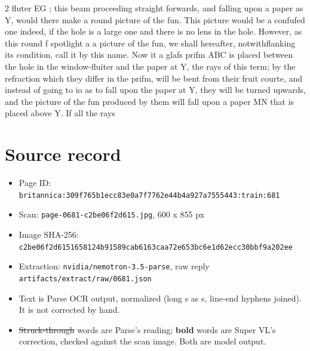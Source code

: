 \documentclass[10pt]{article}
\begin{document}
\begin{multicols}{2}
fluter EG ; this beam proceeding straight forwards, and falling upon a paper as Y, would there make a round picture of the fun. This picture would be a confufed one indeed, if the hole is a large one and there is no lens in the hole. However, as this round f spotlight a a picture of the fun, we shall hereafter, notwithflanking its condition, call it by this name. Now it a glafs prifm ABC is placed between the hole in the window-fluiter and the paper at Y, the rays of this term; by the refraction which they differ in the prifm, will be bent from their fruit courte, and instead of going to io as to fall upon the paper at Y, they will be turned upwards, and the picture of the fun produced by them will fall upon a paper MN that is placed above Y. If all the rays
\end{multicols}
\section*{Source record}
\begin{itemize}
\item Page ID: \texttt{britannica:309f765b1ecc83e0a7f7762e44b4a927a7555443:train:681}
\item Scan: \texttt{page-0681-c2be06f2d615.jpg}, 600 x 855 px
\item Image SHA-256: \texttt{\small c2be06f2d6151658124b91589cab6163caa72e653bc6e1d62ecc30bbf9a202ee}
\item Extraction: \texttt{nvidia/nemotron-3.5-parse}, raw reply \texttt{artifacts/extract/raw/0681.json}
\item Text is Parse OCR output, normalized (long s as s, line-end hyphens joined). It is not corrected by hand.
\item \sout{Struck-through} words are Parse's reading; \textbf{bold} words are Super VL's correction, checked against the scan image. Both are model output.
\end{itemize}
\end{document}
